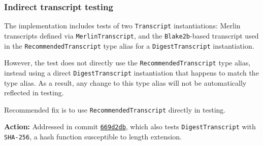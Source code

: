 \documentclass{article}
\begin{document}
\subsubsection{Indirect transcript testing}

The implementation includes tests of two \texttt{Transcript} instantiations: Merlin transcripts defined via \texttt{MerlinTranscript}, and the \texttt{Blake2b}-based transcript used in the \texttt{RecommendedTranscript} type alias for a \texttt{DigestTranscript} instantiation.

However, the test does not directly use the \texttt{RecommendedTranscript} type alias, instead using a direct \texttt{DigestTranscript} instantiation that happens to match the type alias.
As a result, any change to this type alias will not be automatically reflected in testing.

Recommended fix is to use \texttt{RecommendedTranscript} directly in testing.

\textbf{Action:} Addressed in commit \href{https://github.com/serai-dex/serai/commit/669d2dbffc1dafb82a09d9419ea182667115df06}{\texttt{669d2db}}, which also tests \texttt{DigestTranscript} with \texttt{SHA-256}, a hash function susceptible to length extension.
\end{document}
